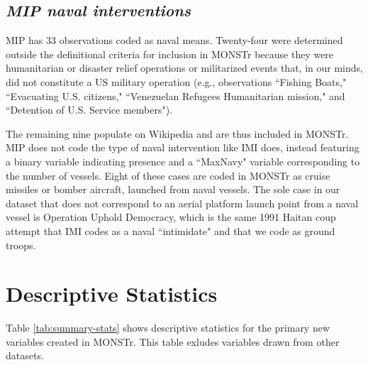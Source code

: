 \documentclass[fleqn,12pt]{article}
\begin{document}
\subsection*{\textit{MIP naval interventions}}
MIP has 33 observations coded as naval means. Twenty-four were determined outside the definitional criteria for inclusion in MONSTr because they were humanitarian or disaster relief operations or militarized events that, in our minds, did not constitute a US military operation (e.g., observations ``Fishing Boats," ``Evacuating U.S. citizens," ``Venezuelan Refugees Humanitarian mission," and ``Detention of U.S. Service members").

The remaining nine populate on Wikipedia and are thus included in MONSTr. MIP does not code the type of naval intervention like IMI does, instead featuring a binary variable indicating presence and a ``MaxNavy" variable corresponding to the number of vessels. Eight of these cases are coded in MONSTr as cruise missiles or bomber aircraft, launched from naval vessels. The sole case in our dataset that does not correspond to an aerial platform launch point from a naval vessel is Operation Uphold Democracy, which is the same 1991 Haitan coup attempt that IMI codes as a naval ``intimidate" and that we code as ground troops.

\section{Descriptive Statistics}
Table \ref{tab:summary-stats} shows descriptive statistics for the primary new variables created in MONSTr. This table exludes variables drawn from other datasets.
\end{document}
